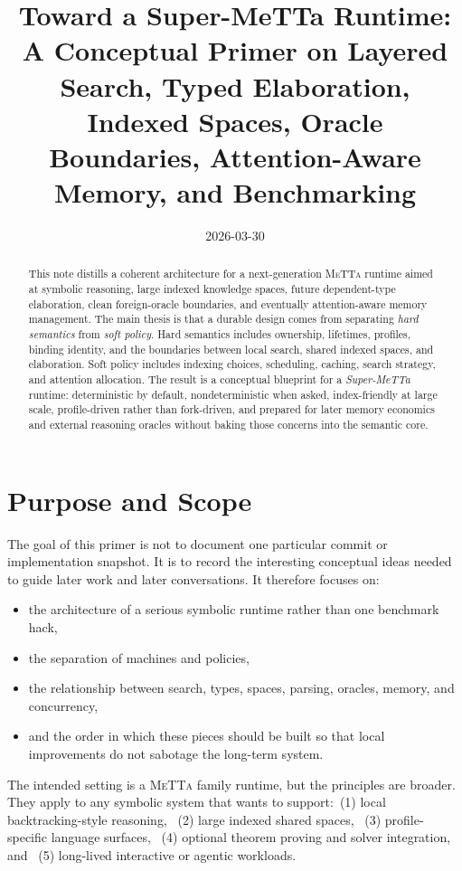 \documentclass[11pt]{article}
\title{Toward a Super-MeTTa Runtime:\\A Conceptual Primer on Layered Search, Typed Elaboration, Indexed Spaces, Oracle Boundaries, Attention-Aware Memory, and Benchmarking}
\author{}
\date{2026-03-30}
\newcommand{\metta}{\textsc{MeTTa}}
\begin{document}
\maketitle

\begin{abstract}
This note distills a coherent architecture for a next-generation \metta{} runtime aimed at symbolic reasoning, large indexed knowledge spaces, future dependent-type elaboration, clean foreign-oracle boundaries, and eventually attention-aware memory management. The main thesis is that a durable design comes from separating \emph{hard semantics} from \emph{soft policy}. Hard semantics includes ownership, lifetimes, profiles, binding identity, and the boundaries between local search, shared indexed spaces, and elaboration. Soft policy includes indexing choices, scheduling, caching, search strategy, and attention allocation. The result is a conceptual blueprint for a \emph{Super-MeTTa} runtime: deterministic by default, nondeterministic when asked, index-friendly at large scale, profile-driven rather than fork-driven, and prepared for later memory economics and external reasoning oracles without baking those concerns into the semantic core.
\end{abstract}

\section{Purpose and Scope}

The goal of this primer is not to document one particular commit or implementation snapshot. It is to record the interesting conceptual ideas needed to guide later work and later conversations. It therefore focuses on:
\begin{itemize}[leftmargin=2em]
  \item the architecture of a serious symbolic runtime rather than one benchmark hack,
  \item the separation of machines and policies,
  \item the relationship between search, types, spaces, parsing, oracles, memory, and concurrency,
  \item and the order in which these pieces should be built so that local improvements do not sabotage the long-term system.
\end{itemize}

The intended setting is a \metta{} family runtime, but the principles are broader. They apply to any symbolic system that wants to support:\
(1) local backtracking-style reasoning, \
(2) large indexed shared spaces, \
(3) profile-specific language surfaces, \
(4) optional theorem proving and solver integration, and \
(5) long-lived interactive or agentic workloads.
\end{document}
